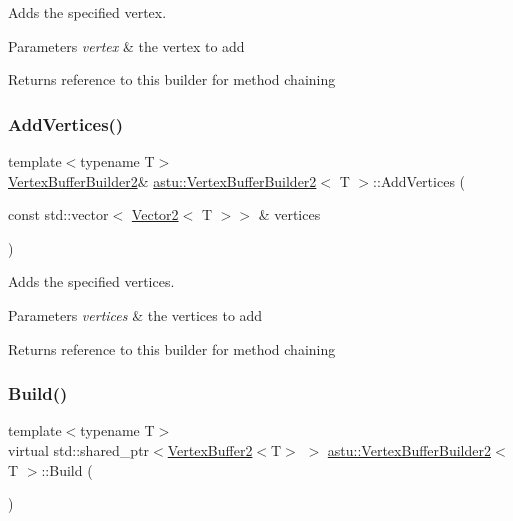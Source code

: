 Adds the specified vertex.


\begin{DoxyParams}{Parameters}
{\em vertex} & the vertex to add \\
\hline
\end{DoxyParams}
\begin{DoxyReturn}{Returns}
reference to this builder for method chaining 
\end{DoxyReturn}
\mbox{\label{classastu_1_1VertexBufferBuilder2_ab79d03bea65cb06b7a2af64fc6fd704b}} 
\subsubsection{\texorpdfstring{Add\+Vertices()}{AddVertices()}}
{\footnotesize\ttfamily template$<$typename T$>$ \\
\hyperlink{classastu_1_1VertexBufferBuilder2}{Vertex\+Buffer\+Builder2}\& \hyperlink{classastu_1_1VertexBufferBuilder2}{astu\+::\+Vertex\+Buffer\+Builder2}$<$ T $>$\+::Add\+Vertices (\begin{DoxyParamCaption}\item[{const std\+::vector$<$ \hyperlink{classastu_1_1Vector2}{Vector2}$<$ T $>$$>$ \&}]{vertices }\end{DoxyParamCaption})\hspace{0.3cm}{\ttfamily [inline]}}

Adds the specified vertices.


\begin{DoxyParams}{Parameters}
{\em vertices} & the vertices to add \\
\hline
\end{DoxyParams}
\begin{DoxyReturn}{Returns}
reference to this builder for method chaining 
\end{DoxyReturn}
\mbox{\label{classastu_1_1VertexBufferBuilder2_a69ce65106844f82fcc34632bfa0d6450}} 
\subsubsection{\texorpdfstring{Build()}{Build()}}
{\footnotesize\ttfamily template$<$typename T$>$ \\
virtual std\+::shared\+\_\+ptr$<$\hyperlink{classastu_1_1VertexBuffer2}{Vertex\+Buffer2}$<$T$>$ $>$ \hyperlink{classastu_1_1VertexBufferBuilder2}{astu\+::\+Vertex\+Buffer\+Builder2}$<$ T $>$\+::Build (\begin{DoxyParamCaption}{ }\end{DoxyParamCaption})\hspace{0.3cm}{\ttfamily [pure virtual]}}

